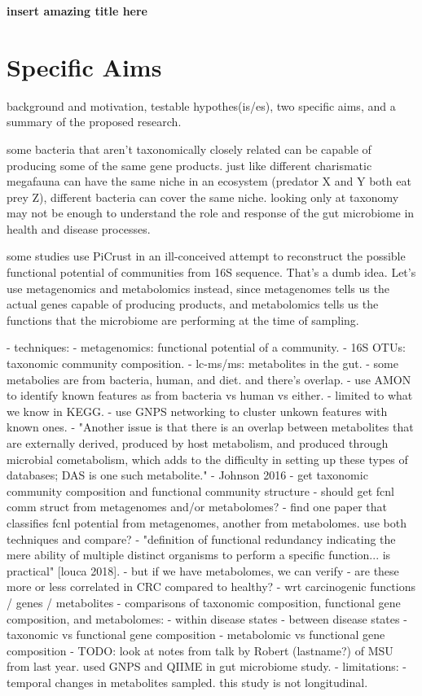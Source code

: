\documentclass[12pt]{article}
\begin{document}
\sloppy
\begin{center}
    \large{
    \textbf{insert amazing title here}
    }
\end{center}
\section*{Specific Aims}

background and motivation, testable hypothes(is/es), two specific aims, and a summary of the proposed research. \cite{bikel_combining_2015}

some bacteria that aren't taxonomically closely related can be capable of producing some of the same gene products.
just like different charismatic megafauna can have the same niche in an ecosystem (predator X and Y both eat prey Z), different bacteria can cover the same niche.
looking only at taxonomy may not be enough to understand the role and response of the gut microbiome in health and disease processes.

some studies use PiCrust in an ill-conceived attempt to reconstruct the possible functional potential of communities from 16S sequence.
That's a dumb idea.
Let's use metagenomics and metabolomics instead, since metagenomes tells us the actual genes capable of producing products, and metabolomics tells us the functions that the microbiome are performing at the time of sampling.

- techniques:
    - metagenomics: functional potential of a community.
    - 16S OTUs: taxonomic community composition.
    - lc-ms/ms: metabolites in the gut.
        - some metabolies are from bacteria, human, and diet. and there's overlap.
            - use AMON to identify known features as from bacteria vs human vs either.
                - limited to what we know in KEGG.
            - use GNPS networking to cluster unkown features with known ones.
            - "Another issue is that there is an overlap between metabolites that are externally derived, produced by host metabolism, and produced through microbial cometabolism, which adds to the difficulty in setting up these types of databases; DAS is one such metabolite." - Johnson 2016
- get taxonomic community composition and functional community structure
    - should get fcnl comm struct from metagenomes and/or metabolomes?
        - find one paper that classifies fcnl potential from metagenomes, another from metabolomes. use both techniques and compare?
    - "definition of functional redundancy indicating the mere ability of multiple distinct organisms to perform a specific function... is practical" [louca 2018].
        - but if we have metabolomes, we can verify
    - are these more or less correlated in CRC compared to healthy?
        - wrt carcinogenic functions / genes / metabolites
- comparisons of taxonomic composition, functional gene composition, and metabolomes:
    - within disease states
    - between disease states
        - taxonomic vs functional gene composition
        - metabolomic vs functional gene composition
- TODO: look at notes from talk by Robert (lastname?) of MSU from last year. used GNPS and QIIME in gut microbiome study.
- limitations:
    - temporal changes in metabolites sampled. this study is not longitudinal.
\end{document}
